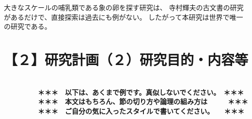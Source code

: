 \documentclass[11pt,a4paper,uplatex,dvipdfmx]{ujarticle} 		%
\newcommand{\研究課題名}{象の卵}
\newcommand{\研究機関名}{逢坂大学}
\newcommand{\研究代表者氏名}{湯川秀樹}
\begin{document}
	大きなスケールの哺乳類である象の卵を探す研究は、
	寺村輝夫の古文書の研究があるだけで、直接探索は過去にも例がない。
	したがって本研究は世界で唯一の研究である。




\section{【２】研究計画（２）研究目的・内容等}

\JSPSInstructions		%
\textbf{\\　　　　　＊＊＊　以下は、あくまで例です。真似しないでください。　＊＊＊\\
　　　　　＊＊＊　本文はもちろん、節の切り方や論理の組み方は　　　＊＊＊\\
　　　　　＊＊＊　ご自分の気に入ったスタイルで書いてください。　　＊＊＊}
\end{document}

